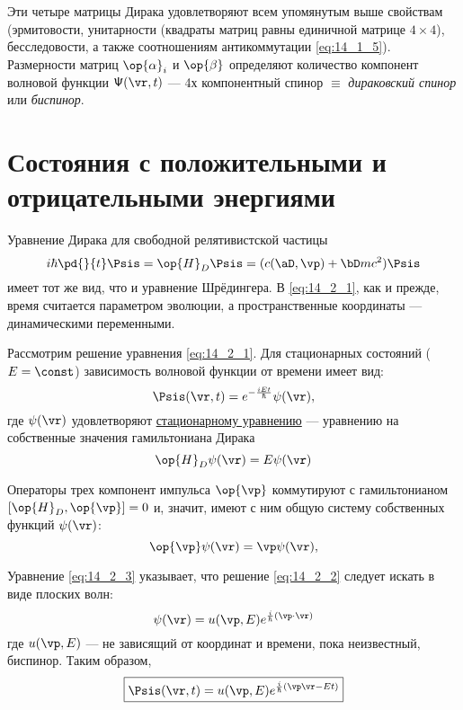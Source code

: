 Эти четыре матрицы Дирака удовлетворяют всем упомянутым выше свойствам (эрмитовости, унитарности (квадраты матриц равны единичной матрице $4 \times 4$), бесследовости, а также соотношениям антикоммутации \eqref{eq:14_1_5}). Размерности матриц $\op{\alpha}_i$ и $\op{\beta}$ определяют количество компонент волновой функции $\mathsf{\Psi}(\vr, t)$ --- 4х компонентный спинор $\equiv$ {\em дираковский спинор} или {\em биспинор}.

\section{Состояния с положительными и отрицательными энергиями}

Уравнение Дирака для свободной релятивистской частицы 
\begin{equation}
\label{eq:14_2_1}
i \hbar \pd{}{t} \Psis = \op{H}_D \Psis = (c(\aD, \vp) + \bD mc^2) \Psis
\end{equation}
имеет тот же вид, что и уравнение Шрёдингера. В \eqref{eq:14_2_1}, как и прежде, время считается параметром эволюции, а пространственные координаты --- динамическими переменными.

Рассмотрим решение уравнения \eqref{eq:14_2_1}. Для стационарных состояний ($E = \const$) зависимость волновой функции от времени имеет вид:
$$
\Psis(\vr, t) = e^{-\frac{i Et}{\hbar}} \psi(\vr),
$$
где $\psi(\vr)$ удовлетворяют \underline{стационарному уравнению} --- уравнению на собственные значения гамильтониана Дирака
\begin{equation}
\label{eq:14_2_2}
\op{H}_D \psi(\vr) = E \psi(\vr)
\end{equation}

Операторы трех компонент импульса $\op{\vp}$ коммутируют с гамильтонианом $[\op{H}_D, \op{\vp}] = 0$ и, значит, имеют с ним общую систему собственных функций $\psi(\vr)$:
\begin{equation}
\label{eq:14_2_3}
\op{\vp} \psi(\vr) = \vp \psi(\vr),
\end{equation}

Уравнение \eqref{eq:14_2_3} указывает, что решение \eqref{eq:14_2_2} следует искать в виде плоских волн:
\begin{equation}
\label{eq:14_2_4}
\psi(\vr) = u(\vp, E) e^{\frac{i}{\hbar}(\vp \cdot \vr)}
\end{equation}
где $u(\vp, E)$ --- не зависящий от координат и времени, пока неизвестный, биспинор. Таким образом,
$$
\boxed{\Psis(\vr, t) = u(\vp, E) e^{\frac{i}{\hbar}(\vp \vr - Et)}}
$$

